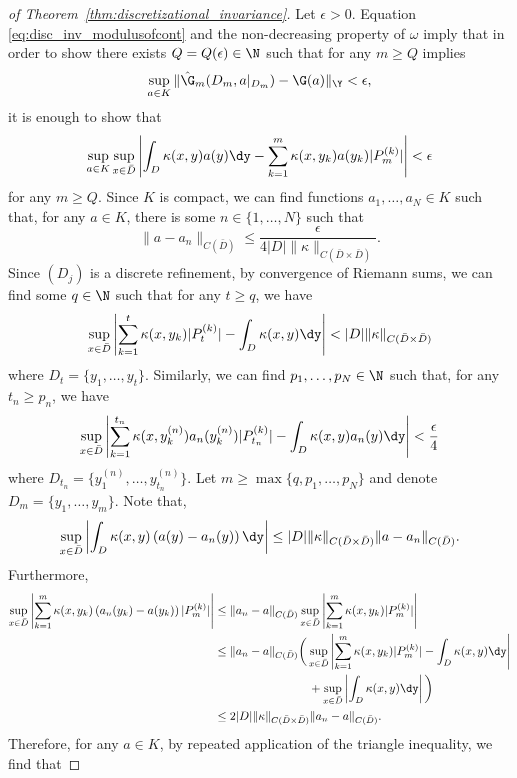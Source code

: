 {\begin{proof}[of Theorem~\ref{thm:discretizational_invariance}]
Let \(\epsilon > 0\). Equation \eqref{eq:disc_inv_modulusofcont} and the non-decreasing property of \(\omega\) imply that in order to show there exists \(Q = Q(\epsilon) \in \N\) such that for any \(m \geq Q\) implies 
\[\sup_{a \in K}\| \hat{\G}_m (D_m, a|_{D_m}) - \G(a)\|_\Y < \epsilon,\]
it is enough to show that
\begin{equation}
\label{eq:disc_inv_needtoshow}
\sup_{a \in K} \sup_{x \in \bar{D}} \left | \int_D \kappa(x,y) a(y) \dy - \sum_{k=1}^m \kappa(x,y_k) a(y_k) |P_m^{(k)}| \right | < \epsilon
\end{equation}
for any \(m \geq Q\).
Since \(K\) is compact, we can find functions \(a_1,\dots,a_N \in K\) such that, for any \(a \in K\), there is some \(n \in \{1,\dots,N\}\) such that
\[\|a-a_n\|_{C(\bar{D})} \leq \frac{\epsilon}{4 |D| \|\kappa\|_{C(\bar{D} \times \bar{D})}}.\]
Since \((D_j)\) is a discrete refinement, by convergence of Riemann sums, we can find some \(q \in \N\) such that for any \(t \geq q\), we have
\[\sup_{x \in \bar{D}} \left | \sum_{k=1}^t \kappa(x,y_k) |P_t^{(k)}| - \int_{D} \kappa(x,y) \dy  \right | < |D| \|\kappa\|_{C(\bar{D} \times \bar{D})}\]
where \(D_t = \{y_1,\dots,y_t\}\). Similarly, we can find \(p_1,\dots,p_N \in \N\) such that, for any \(t_n \geq p_n\), we have
\[\sup_{x \in \bar{D}} \left | \sum_{k=1}^{t_n} \kappa(x,y_k^{(n)}) a_n(y_k^{(n)}) |P_{t_n}^{(k)}| - \int_D \kappa(x,y) a_n(y) \dy \right | < \frac{\epsilon}{4}\]
where \(D_{t_n} = \{y_1^{(n)},\dots,y_{t_n}^{(n)}\}\).
Let \(m \geq \max \{q,p_1,\dots,p_N\}\) and denote \(D_m = \{y_1,\dots,y_m\}\).
Note that,
\[\sup_{x \in \bar{D}} \left | \int_D \kappa(x,y) \left ( a(y) - a_n(y) \right ) \dy \right | \leq |D| \|\kappa\|_{C(\bar{D} \times \bar{D})} \|a - a_n\|_{C(\bar{D})}.\]
Furthermore,
\begin{align*}
    \sup_{x \in \bar{D}} \left | \sum_{k=1}^m \kappa(x,y_k) \left ( a_n(y_k) - a(y_k) \right ) |P_m^{(k)}| \right | &\leq \|a_n - a \|_{C(\bar{D})} \sup_{x \in \bar{D}} \left | \sum_{k=1}^m \kappa(x,y_k) |P_m^{(k)}| \right | \\
    &\leq \|a_n - a \|_{C(\bar{D})} \bigg ( \sup_{x \in \bar{D}} \left | \sum_{k=1}^m \kappa(x,y_k) |P_m^{(k)}| - \int_{D} \kappa(x,y) \dy  \right | \\
    &\qquad\qquad\qquad\qquad+ \sup_{x \in \bar{D}} \left | \int_D \kappa(x,y) \dy \right | \bigg  ) \\
    &\leq 2 |D|\|\kappa\|_{C(\bar{D} \times \bar{D})} \|a_n - a \|_{C(\bar{D})}.
\end{align*}
Therefore, for any \(a \in K\), by repeated application of the triangle inequality, we find that 

\end{proof}}
